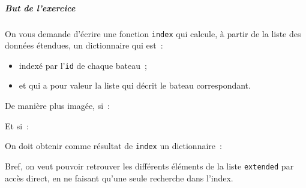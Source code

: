     \hypertarget{but-de-lexercice}{%
\subparagraph{But de l'exercice}\label{but-de-lexercice}}

    On vous demande d'écrire une fonction \texttt{index} qui calcule, à
partir de la liste des données étendues, un dictionnaire qui est~:

\begin{itemize}
\tightlist
\item
  indexé par l'\texttt{id} de chaque bateau~;
\item
  et qui a pour valeur la liste qui décrit le bateau correspondant.
\end{itemize}

    De manière plus imagée, si~:

\begin{Shaded}
\begin{Highlighting}[frame=lines,framerule=0.6mm,rulecolor=\color{asisframecolor}]
\OperatorTok{=}
\end{Highlighting}
\end{Shaded}

Et si~:

\begin{Shaded}
\begin{Highlighting}[frame=lines,framerule=0.6mm,rulecolor=\color{asisframecolor}]
\OperatorTok{=}\NormalTok{ [ id1, latitude, ... ]}
\end{Highlighting}
\end{Shaded}

On doit obtenir comme résultat de \texttt{index} un dictionnaire~:

\begin{Shaded}
\begin{Highlighting}[frame=lines,framerule=0.6mm,rulecolor=\color{asisframecolor}]
\NormalTok{\{}
\OperatorTok{->}
\NormalTok{\}}
\end{Highlighting}
\end{Shaded}

Bref, on veut pouvoir retrouver les différents éléments de la liste
\texttt{extended} par accès direct, en ne faisant qu'une seule recherche
dans l'index.

